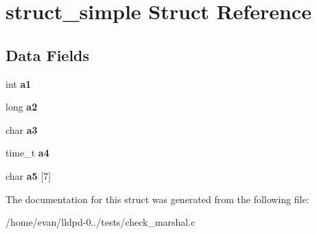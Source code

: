 \section{struct\-\_\-simple \-Struct \-Reference}
\label{structstruct__simple}
\subsection*{\-Data \-Fields}
\begin{DoxyCompactItemize}
\item 
int {\bfseries a1}\label{structstruct__simple_a4eaab29a4b95a3df43f309d4db0537f9}

\item 
long {\bfseries a2}\label{structstruct__simple_a9b2ede9f12936fc20dc8e3803047b561}

\item 
char {\bfseries a3}\label{structstruct__simple_afda07ac4cb25f109458331051402c4bb}

\item 
time\-\_\-t {\bfseries a4}\label{structstruct__simple_a0778adb169fa58a40a969e548b4edb3a}

\item 
char {\bfseries a5} [7]\label{structstruct__simple_a720d06191045f0a1cd1501810138bb7f}

\end{DoxyCompactItemize}


\-The documentation for this struct was generated from the following file\-:\begin{DoxyCompactItemize}
\item 
/home/evan/lldpd-\/0../tests/check\-\_\-marshal.\-c\end{DoxyCompactItemize}
